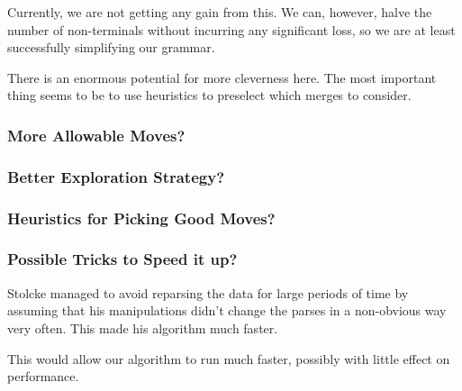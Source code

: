 \documentclass{article}
\begin{document}
Currently, we are not getting any gain from this. We can, however,
halve the number of non-terminals without incurring any significant
loss, so we are at least successfully simplifying our grammar.

There is an enormous potential for more cleverness here. The most
important thing seems to be to use heuristics to preselect which
merges to consider.

\subsubsection{More Allowable Moves?}
\subsubsection{Better Exploration Strategy?}
\subsubsection{Heuristics for Picking Good Moves?}

\subsubsection{Possible Tricks to Speed it up?}
Stolcke managed to avoid reparsing the data for large periods of time
by assuming that his manipulations didn't change the parses in a
non-obvious way very often. This made his algorithm much faster.

This would allow our algorithm to run much faster, possibly with
little effect on performance.
\end{document}
